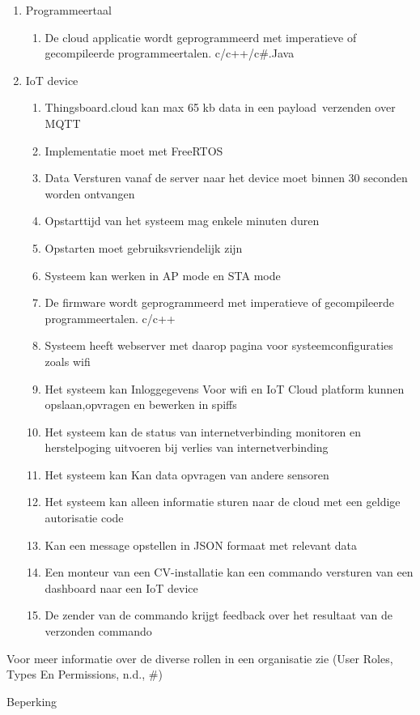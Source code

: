 \begin{enumerate}
	\item Programmeertaal
	\begin{enumerate}
		\item De cloud applicatie wordt geprogrammeerd met imperatieve of gecompileerde programmeertalen. c/c++/c#.Java
	\end{enumerate}
	\item IoT device
	\begin{enumerate}
		\item Thingsboard.cloud kan max 65 kb data in een payload  verzenden over MQTT 
		\item Implementatie moet met FreeRTOS 
		\item Data Versturen vanaf de server naar het device moet binnen 30 seconden worden ontvangen
		\item Opstarttijd van het systeem mag enkele minuten duren 
		\item Opstarten moet gebruiksvriendelijk zijn 
		\item Systeem kan werken in AP mode en STA mode
		\item De firmware wordt geprogrammeerd met imperatieve of gecompileerde programmeertalen. c/c++
		\item Systeem heeft webserver met daarop pagina voor systeemconfiguraties zoals wifi
		\item Het systeem kan Inloggegevens Voor wifi en IoT Cloud platform kunnen opslaan,opvragen en bewerken in spiffs
		\item Het systeem kan de status van internetverbinding monitoren en herstelpoging uitvoeren bij verlies van internetverbinding
		\item Het systeem kan Kan data opvragen van andere sensoren
		\item Het systeem kan alleen informatie sturen naar de cloud met een geldige autorisatie code
		\item Kan een message opstellen in JSON formaat met relevant data
		\item Een monteur van een CV-installatie kan een commando versturen van een dashboard naar een IoT device
		\item De zender van de commando krijgt feedback over het resultaat van de verzonden commando
	\end{enumerate}
	
\end{enumerate}
Voor meer informatie over de diverse rollen in een organisatie zie (User Roles, Types En Permissions, n.d., #)


Beperking




